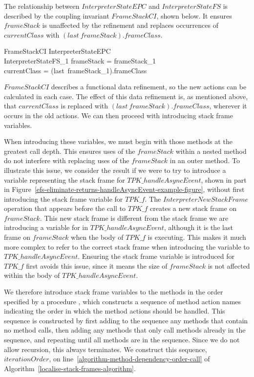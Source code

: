 The relationship between $InterpreterStateEPC$ and
$InterpreterStateFS$ is described by the coupling invariant
$FrameStackCI$, shown below.
It ensures $frameStack$ is unaffected by the refinement and replaces
occurrences of $currentClass$ with $(last~frameStack).frameClass$.
\begin{schema}{FrameStackCI}
  InterpreterStateEPC \\
  InterpreterStateFS_1
\where
  frameStack = frameStack_1 \\
  currentClass = (last~frameStack_1).frameClass
\end{schema}

$FrameStackCI$ describes a functional data refinement, so the new
actions can be calculated in each case.
The effect of this data refinement is, as mentioned above, that
$currentClass$ is replaced with $(last~frameStack).frameClass$,
wherever it occurs in the old actions.
We can then proceed with introducing stack frame variables.

When introducing these variables, we must begin with those methods at
the greatest call depth.
This ensures uses of the $frameStack$ within a nested method do not
interfere with replacing uses of the $frameStack$ in an outer method.
To illustrate this issue, we consider the result if we were to try to
introduce a variable representing the stack frame for
$TPK\_handleAsyncEvent$, shown in part in
Figure~\ref{efs-eliminate-returns-handleAsyncEvent-example-figure},
without first introducing the stack frame variable for $TPK\_f$.
The $InterpreterNewStackFrame$ operation that appears before the call
to $TPK\_f$ creates a new stack frame on $frameStack$.
This new stack frame is different from the stack frame we are
introducing a variable for in $TPK\_handleAsyncEvent$, although it
is the last frame on $frameStack$ when the body of $TPK\_f$ is executing.
This makes it much more complex to refer to the correct stack frame when
introducing the variable to $TPK\_handleAsyncEvent$.
Ensuring the stack frame variable is introduced for $TPK\_f$ first
avoids this issue, since it means the size of $frameStack$ is not
affected within the body of $TPK\_handleAsyncEvent$.

We therefore introduce stack frame variables to the methods in the
order specified by a procedure , which
constructs a sequence of method action names indicating the order in
which the method actions should be handled.
This sequence is constructed by first adding to the sequence any
methods that contain no method calls, then adding any methods that
only call methods already in the sequence, and repeating until all
methods are in the sequence.
Since we do not allow recursion, this always terminates.
We construct this sequence, $iterationOrder$, on
line~\ref{algorithm-method-dependency-order-call} of
Algorithm~\ref{localise-stack-frames-algorithm}.

